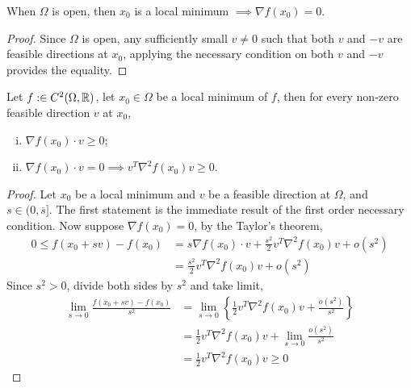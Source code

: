 \documentclass{article}
\begin{document}
   	\begin{corollary}
   		When $\Omega$ is open, then $x_0$ is a local minimum $\implies \nabla f(x_0) = 0$.
   	\end{corollary}
   	\begin{proof}
   		Since $\Omega$ is open, any sufficiently small $v \neq 0$ such that both $v$ and $-v$ are feasible directions at $x_0$, applying the necessary condition on both $v$ and $-v$ provides the equality.
   	\end{proof}
   	
%   	
   	
   	\begin{theorem}
   		Let $f: \in C^2(\Omega, \mathbb{R})$, let $x_0 \in \Omega$ be a local minimum of $f$, then for every non-zero feasible direction $v$ at $x_0$,
   		\begin{enumerate}[(i)]
   			\item $\nabla f(x_0) \cdot v \geq 0$;
   			\item $\nabla f(x_0) \cdot v = 0 \implies v^T \nabla^2 f(x_0) v \geq 0$.
   		\end{enumerate}
   	\end{theorem}
   	
   	\begin{proof}
   		Let $x_0$ be a local minimum and $v$ be a feasible direction at $\Omega$, and $s \in (0, \overline{s}]$. The first statement is the immediate result of the first order necessary condition. Now suppose $\nabla f(x_0) = 0$, by the Taylor's theorem,
   		\begin{align}
   			0 \leq f(x_0 + sv) - f(x_0) &= s \nabla f(x_0) \cdot v + \frac{s^2}{2} v^T \nabla^2 f(x_0) v + o(s^2) \\
   			&=\frac{s^2}{2} v^T \nabla^2 f(x_0) v + o(s^2)
   		\end{align}
   		Since $s^2 > 0$, divide both sides by $s^2$ and take limit,
   		\begin{align}
   			\lim_{s \to 0} \frac{f(x_0 + sv) - f(x_0)}{s^2} &= \lim_{s \to 0} 
   			\left \{\frac{1}{2} v^T \nabla^2 f(x_0) v + \frac{o(s^2)}{s^2} \right\}\\
   			&= \frac{1}{2} v^T \nabla^2 f(x_0) v + \lim_{s \to 0} \frac{o(s^2)}{s^2} \\
   			&= \frac{1}{2} v^T \nabla^2 f(x_0) v \geq 0
   		\end{align}
   	\end{proof}
   	
\end{document}
